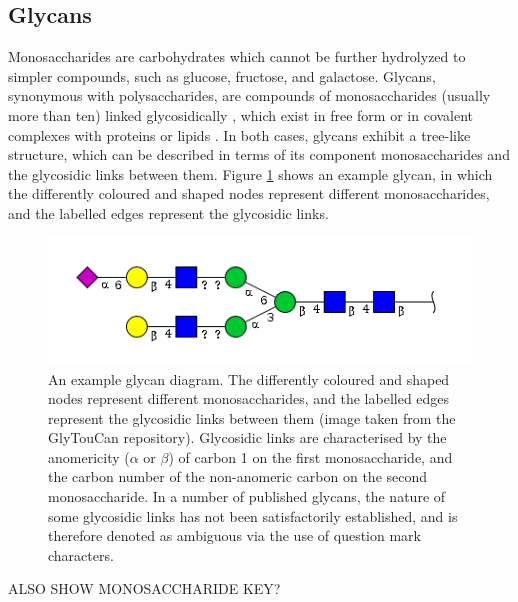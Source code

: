 \documentclass[12pt,a4paper]{article}
\begin{document}
\subsection{Glycans}
\label{sec:glycans_description}
Monosaccharides are carbohydrates which cannot be further hydrolyzed to simpler compounds, such as glucose, fructose, and galactose. Glycans, synonymous with polysaccharides, are compounds of monosaccharides (usually more than ten) linked glycosidically \citep{mcnaught1997compendium}, which exist in free form or in covalent complexes with proteins or lipids \citep{doi:10.1093/bioinformatics/btm090}. In both cases, glycans exhibit a tree-like structure, which can be described in terms of its component monosaccharides and the glycosidic links between them. Figure \ref{fig:example_glycan} shows an example glycan, in which the differently coloured and shaped nodes represent different monosaccharides, and the labelled edges represent the glycosidic links.\\

\begin{figure}[H]
\centering 
\includegraphics[scale=0.8]{images/glycan_G31576LD.png} 
\caption{An example glycan diagram. The differently coloured and shaped nodes represent different monosaccharides, and the labelled edges represent the glycosidic links between them (image taken from the GlyTouCan repository\protect\footnotemark). Glycosidic links are characterised by the anomericity ($\alpha$ or $\beta$) of carbon 1 on the first monosaccharide, and the carbon number of the non-anomeric carbon on the second monosaccharide. In a number of published glycans, the nature of some glycosidic links has not been satisfactorily established, and is therefore denoted as ambiguous via the use of question mark characters.}
\label{fig:example_glycan}
\end{figure}


ALSO SHOW MONOSACCHARIDE KEY?\\
\end{document}
